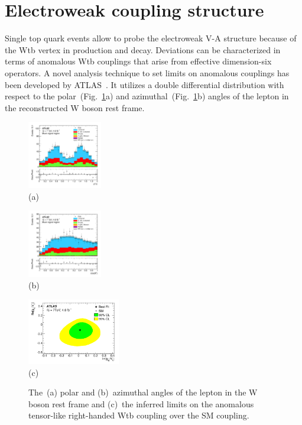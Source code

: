 \documentclass{PoS}
\begin{document}
\section{Electroweak coupling structure}
Single top quark events allow to probe the electroweak V-A structure because of the Wtb vertex in production and decay. Deviations can be characterized in terms of anomalous Wtb couplings that arise from effective dimension-six operators. A novel analysis technique to set limits on anomalous couplings has been developed by ATLAS~\cite{atlas-anomcoupl}. It utilizes a double differential distribution with respect to the polar~(Fig.~\ref{fig:angles}a) and azimuthal~(Fig.~\ref{fig:angles}b) angles of the lepton in the reconstructed W boson rest frame.

\begin{figure}[htbp]
\begin{center}
\parbox[t]{0.3\textwidth}{\centering\includegraphics[width=0.29\textwidth]{atlas_anomcoupl/phi.pdf}\\(a)}
\parbox[t]{0.3\textwidth}{\centering\includegraphics[width=0.29\textwidth]{atlas_anomcoupl/theta.pdf}\\(b)}
\parbox[t]{0.38\textwidth}{\centering\includegraphics[width=0.36\textwidth]{atlas_anomcoupl/limits.pdf}\\(c)}
\end{center}
\caption{\label{fig:angles}The~(a) polar and (b)~azimuthal angles of the lepton in the W boson rest frame and (c)~the inferred limits on the anomalous tensor-like right-handed Wtb coupling over the SM coupling.}
\end{figure}
\end{document}
